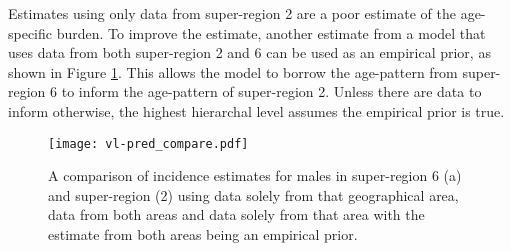 Estimates using only data from super-region 2 are a poor estimate of the age-specific burden.  To improve the estimate, another estimate from a model that uses data from both super-region 2 and 6 can be used as an empirical prior, as shown in Figure \ref{fig:app-vl pred compare}.  This allows the model to borrow the age-pattern from super-region 6 to inform the age-pattern of super-region 2.  Unless there are data to inform otherwise, the highest hierarchal level assumes the empirical prior is true.

    \begin{figure}[h]
        \begin{center}
            \texttt{[image: vl-pred\_compare.pdf]}
            \caption{A comparison of incidence estimates for males in super-region 6 (a) and super-region (2) using data solely from that geographical area, data from both areas and data solely from that area with the estimate from both areas being an empirical prior.}
            \label{fig:app-vl pred compare}
        \end{center}
    \end{figure} 